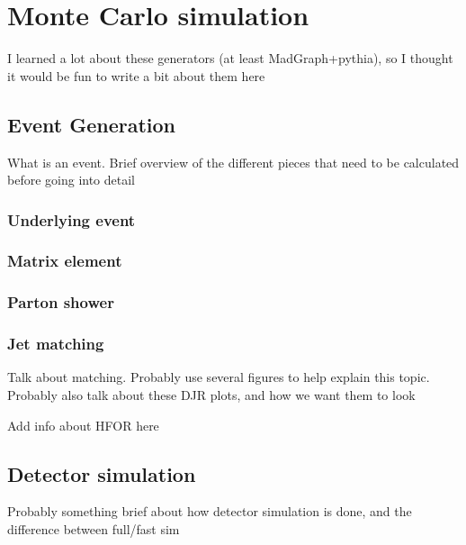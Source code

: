 \chapter[Monte Carlo simulation][Monte Carlo simulation]{Monte Carlo simulation}

{\color{red} I learned a lot about these generators (at least MadGraph+pythia),
  so I thought it would be fun to write a bit about them here}

\section{Event Generation}

{\color{red} What is an event. Brief overview of the different pieces that need
  to be calculated before going into detail}

\subsection{Underlying event}

\subsection{Matrix element}

\subsection{Parton shower}

\subsection{Jet matching}
\label{sec:jet_matching}

{\color{red} Talk about matching. Probably use several figures to help explain
  this topic. Probably also talk about these DJR plots, and how we want them
  to look}

{\color{red} Add info about HFOR here}

\section{Detector simulation}

{\color{red} Probably something brief about how detector simulation is done, and
  the difference between full/fast sim}

